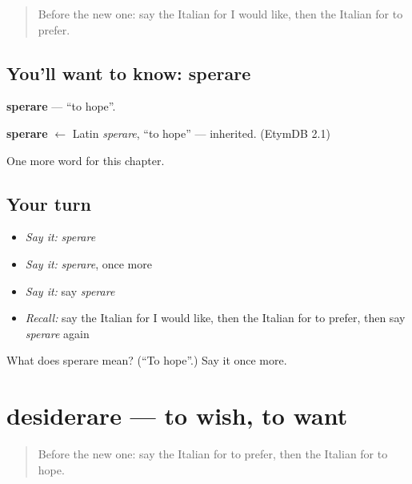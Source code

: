 \label{lesson:IT-C86-sperare}



\begin{quote}
Before the new one: say the Italian for I would like, then the Italian for to prefer.
\end{quote}

\subsection*{You'll want to know: sperare}
\textbf{sperare} — \textquotedblleft{}to hope\textquotedblright{}.

\begin{cousinweb}
\textbf{sperare} $\leftarrow$ Latin \emph{sperare}, \textquotedblleft{}to hope\textquotedblright{} — inherited. (EtymDB 2.1)
\end{cousinweb}

\begin{grammarlens}[title={What you've built}]
One more word for this chapter.
\end{grammarlens}

\subsection*{Your turn}
\begin{itemize}
\raggedright
  \item \emph{Say it:} \emph{sperare}
  \item \emph{Say it:} \emph{sperare}, once more
  \item \emph{Say it:} say \emph{sperare}
  \item \emph{Recall:} say the Italian for I would like, then the Italian for to prefer, then say \emph{sperare} again
\end{itemize}

\begin{tcolorbox}[breakable,colback=teal!4,colframe=teal!35!black,title={Before you move on}]
What does sperare mean? (\textquotedblleft{}To hope\textquotedblright{}.) Say it once more.
\end{tcolorbox}
\section[desiderare]{desiderare — to wish, to want}

\label{lesson:IT-C86-desiderare}



\begin{quote}
Before the new one: say the Italian for to prefer, then the Italian for to hope.
\end{quote}


